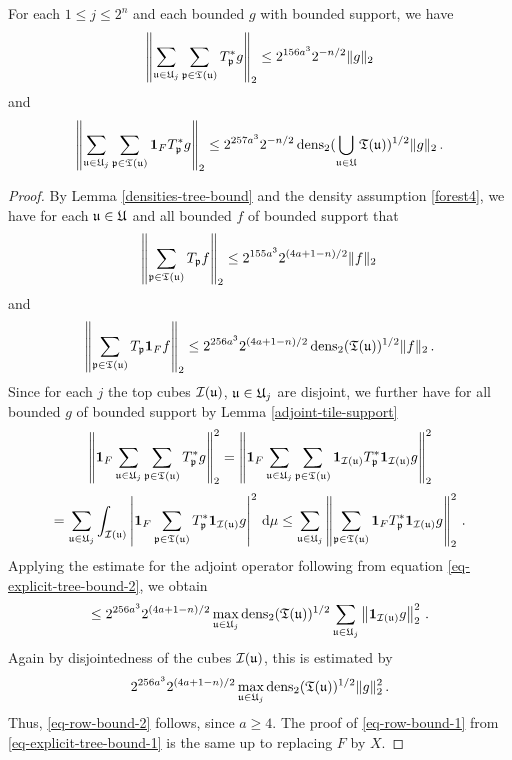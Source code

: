 {\begin{lemma}
    \label{row-bound}
    For each $1 \le j \le 2^n$ and each bounded $g$ with bounded support, we have
    \begin{equation}
        \label{eq-row-bound-1}
        \left\| \sum_{{\mathfrak u} \in {\mathfrak U}_j} \sum_{{\mathfrak p} \in {\mathfrak T}({\mathfrak u})}  T_{{\mathfrak p}}^* g\right\|_2 \le 2^{156a^3} 2^{-n/2} \|g\|_2
    \end{equation}
    and
    \begin{equation}
        \label{eq-row-bound-2}
        \left\| \sum_{{\mathfrak u} \in {\mathfrak U}_j} \sum_{{\mathfrak p} \in {\mathfrak T}({\mathfrak u})} \mathbf{1}_F T_{{\mathfrak p}}^* g\right\|_2 \le 2^{257a^3} 2^{-n/2} \operatorname{\operatorname{dens}}_2(\bigcup_{{\mathfrak u}\in {\mathfrak U}}{\mathfrak T}({\mathfrak u}))^{1/2}  \|g\|_2\,.
    \end{equation}
\end{lemma}

\begin{proof}
    By Lemma \ref{densities-tree-bound} and the density assumption \eqref{forest4}, we have for each ${\mathfrak u} \in {\mathfrak U}$ and all bounded $f$ of bounded support that
    \begin{equation}
        \label{eq-explicit-tree-bound-1}
        \left\|\sum_{{\mathfrak p} \in {\mathfrak T}({\mathfrak u})} T_{{\mathfrak p}} f \right\|_{2}  \le 2^{155a^3} 2^{(4a+1-n)/2}  \|f\|_2\,
    \end{equation}
    and
    \begin{equation}
        \label{eq-explicit-tree-bound-2}
        \left\|\sum_{{\mathfrak p} \in {\mathfrak T}({\mathfrak u})} T_{{\mathfrak p}} \mathbf{1}_F f \right\|_{2} \le 2^{256a^3} 2^{(4a + 1-n)/2} \operatorname{\operatorname{dens}}_2({\mathfrak T}({\mathfrak u}))^{1/2} \|f\|_2\,.
    \end{equation}
    Since for each $j$ the top cubes ${\mathcal{I}}({\mathfrak u})$, ${\mathfrak u} \in {\mathfrak U}_j$ are disjoint, we further have for all bounded $g$ of bounded support by Lemma \ref{adjoint-tile-support}
    $$
        \left\|\mathbf{1}_F \sum_{{\mathfrak u} \in {\mathfrak U}_j} \sum_{{\mathfrak p} \in {\mathfrak T}({\mathfrak u})} T_{{\mathfrak p}}^* g\right\|_2^2 = \left\|\mathbf{1}_F \sum_{{\mathfrak u} \in {\mathfrak U}_j} \sum_{{\mathfrak p} \in {\mathfrak T}({\mathfrak u})} \mathbf{1}_{{\mathcal{I}}({\mathfrak u})} T_{{\mathfrak p}}^* \mathbf{1}_{{\mathcal{I}}({\mathfrak u})} g\right\|_2^2
    $$
    $$
        = \sum_{{\mathfrak u} \in {\mathfrak U}_j} \int_{{\mathcal{I}}({\mathfrak u})} \left| \mathbf{1}_F \sum_{{\mathfrak p} \in {\mathfrak T}({\mathfrak u})} T_{{\mathfrak p}}^* \mathbf{1}_{{\mathcal{I}}({\mathfrak u})} g\right|^2 \, \mathrm{d}\mu
        \le \sum_{{\mathfrak u} \in {\mathfrak U}_j} \left\|\sum_{{\mathfrak p} \in {\mathfrak T}({\mathfrak u})} \mathbf{1}_F T_{{\mathfrak p}}^* \mathbf{1}_{{\mathcal{I}}({\mathfrak u})} g\right\|_2^2\,.
    $$
    Applying the estimate for the adjoint operator following from equation \eqref{eq-explicit-tree-bound-2}, we obtain
    $$
        \le 2^{256a^3} 2^{(4a+1-n)/2} \max_{{\mathfrak u} \in {\mathfrak U}_j}\operatorname{\operatorname{dens}}_2({\mathfrak T}({\mathfrak u}))^{1/2} \sum_{{\mathfrak u} \in {\mathfrak U}_j} \left\| \mathbf{1}_{{\mathcal{I}}({\mathfrak u})} g\right\|_2^2\,.
    $$
    Again by disjointedness of the cubes ${\mathcal{I}}({\mathfrak u})$, this is estimated by
    $$
        2^{256a^3} 2^{(4a+1-n)/2} \max_{{\mathfrak u} \in {\mathfrak U}_j}\operatorname{\operatorname{dens}}_2({\mathfrak T}({\mathfrak u}))^{1/2} \|g\|_2^2\,.
    $$
    Thus, \eqref{eq-row-bound-2} follows, since $a \ge 4$.
    The proof of \eqref{eq-row-bound-1} from \eqref{eq-explicit-tree-bound-1} is the same up to replacing $F$ by $X$.
\end{proof}

}
